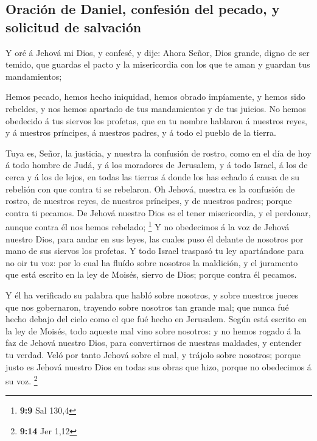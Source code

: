 \hypertarget{oraciuxf3n-de-daniel-confesiuxf3n-del-pecado-y-solicitud-de-salvaciuxf3n}{%
\subsection{Oración de Daniel, confesión del pecado, y solicitud de
salvación}\label{oraciuxf3n-de-daniel-confesiuxf3n-del-pecado-y-solicitud-de-salvaciuxf3n}}

 Y oré á Jehová mi Dios, y confesé, y dije: Ahora Señor,
Dios grande, digno de ser temido, que guardas el pacto y la misericordia
con los que te aman y guardan tus mandamientos;

 Hemos pecado, hemos hecho iniquidad, hemos obrado
impíamente, y hemos sido rebeldes, y nos hemos apartado de tus
mandamientos y de tus juicios.  No hemos obedecido á tus
siervos los profetas, que en tu nombre hablaron á nuestros reyes, y á
nuestros príncipes, á nuestros padres, y á todo el pueblo de la tierra.

 Tuya es, Señor, la justicia, y nuestra la confusión de
rostro, como en el día de hoy á todo hombre de Judá, y á los moradores
de Jerusalem, y á todo Israel, á los de cerca y á los de lejos, en todas
las tierras á donde los has echado á causa de su rebelión con que contra
ti se rebelaron.  Oh Jehová, nuestra es la confusión de
rostro, de nuestros reyes, de nuestros príncipes, y de nuestros padres;
porque contra ti pecamos.  De Jehová nuestro Dios es el
tener misericordia, y el perdonar, aunque contra él nos hemos rebelado;
\footnote{\textbf{9:9} Sal 130,4}  Y no obedecimos á la
voz de Jehová nuestro Dios, para andar en sus leyes, las cuales puso él
delante de nosotros por mano de sus siervos los profetas.
 Y todo Israel traspasó tu ley apartándose para no oir tu
voz: por lo cual ha fluído sobre nosotros la maldición, y el juramento
que está escrito en la ley de Moisés, siervo de Dios; porque contra él
pecamos.

 Y él ha verificado su palabra que habló sobre nosotros,
y sobre nuestros jueces que nos gobernaron, trayendo sobre nosotros tan
grande mal; que nunca fué hecho debajo del cielo como el que fué hecho
en Jerusalem.  Según está escrito en la ley de Moisés,
todo aqueste mal vino sobre nosotros: y no hemos rogado á la faz de
Jehová nuestro Dios, para convertirnos de nuestras maldades, y entender
tu verdad.  Veló por tanto Jehová sobre el mal, y trájolo
sobre nosotros; porque justo es Jehová nuestro Dios en todas sus obras
que hizo, porque no obedecimos á su voz. \footnote{\textbf{9:14} Jer
  1,12}

